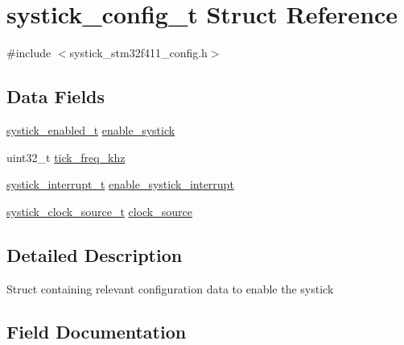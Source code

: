 \hypertarget{structsystick__config__t}{}\section{systick\+\_\+config\+\_\+t Struct Reference}
\label{structsystick__config__t}


{\ttfamily \#include $<$systick\+\_\+stm32f411\+\_\+config.\+h$>$}

\subsection*{Data Fields}
\begin{DoxyCompactItemize}
\item 
\hyperlink{systick__stm32f411__config_8h_a54abff3d12292257e357d04094ebc415}{systick\+\_\+enabled\+\_\+t} \hyperlink{structsystick__config__t_a072e52389584956edd057c591c1c7cd8}{enable\+\_\+systick}
\item 
uint32\+\_\+t \hyperlink{structsystick__config__t_a5d1767c41ce5e869439e7197fd6a7373}{tick\+\_\+freq\+\_\+khz}
\item 
\hyperlink{systick__stm32f411__config_8h_a82589cfda6cc55b21d80e5e3f47b69d9}{systick\+\_\+interrupt\+\_\+t} \hyperlink{structsystick__config__t_ae4174393003a47f219770a2e5793de45}{enable\+\_\+systick\+\_\+interrupt}
\item 
\hyperlink{systick__stm32f411__config_8h_a39469603d3120252cd4f82defbd9525e}{systick\+\_\+clock\+\_\+source\+\_\+t} \hyperlink{structsystick__config__t_a47a24c541e5d6123ec5825484d4f85f0}{clock\+\_\+source}
\end{DoxyCompactItemize}


\subsection{Detailed Description}
Struct containing relevant configuration data to enable the systick 

\subsection{Field Documentation}
\mbox{\label{structsystick__config__t_a47a24c541e5d6123ec5825484d4f85f0}} 
